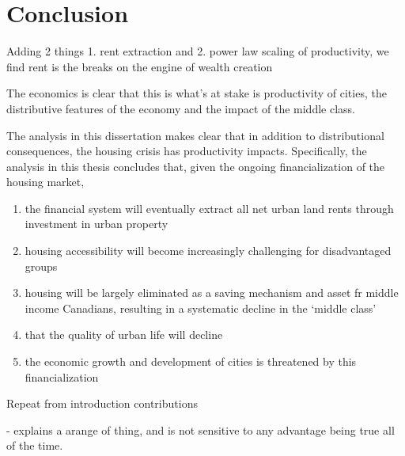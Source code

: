 
\chapter{Conclusion}

Adding 2 things 1. rent extraction and 2. power law scaling of productivity, we find rent is the breaks on the engine of wealth creation

The economics is clear that this is what's at stake is productivity of cities, the distributive features of the economy and the impact of the middle class.

The analysis in this dissertation makes clear that in addition to distributional consequences, the housing crisis has productivity impacts. Specifically, the analysis in this thesis concludes that, given the ongoing financialization of the housing market,

\begin{enumerate}
\item the financial system will eventually extract all net urban land rents through investment in urban property
\item housing accessibility will become increasingly challenging for disadvantaged groups
\item housing will be largely eliminated as a saving mechanism and asset fr middle income Canadians,  resulting in a systematic decline in the `middle class'
\item that the quality of urban life will decline
\item the economic growth and development of cities is threatened by this financialization
\end{enumerate}




Repeat from introduction contributions

- explains a arange of thing, 
and is not sensitive to any advantage being true all of the time. 